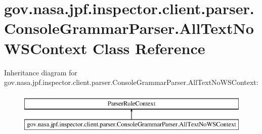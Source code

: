\hypertarget{classgov_1_1nasa_1_1jpf_1_1inspector_1_1client_1_1parser_1_1_console_grammar_parser_1_1_all_text_no_w_s_context}{}\section{gov.\+nasa.\+jpf.\+inspector.\+client.\+parser.\+Console\+Grammar\+Parser.\+All\+Text\+No\+W\+S\+Context Class Reference}
\label{classgov_1_1nasa_1_1jpf_1_1inspector_1_1client_1_1parser_1_1_console_grammar_parser_1_1_all_text_no_w_s_context}
Inheritance diagram for gov.\+nasa.\+jpf.\+inspector.\+client.\+parser.\+Console\+Grammar\+Parser.\+All\+Text\+No\+W\+S\+Context\+:\begin{figure}[H]
\begin{center}
\leavevmode
\includegraphics[height=2.000000cm]{classgov_1_1nasa_1_1jpf_1_1inspector_1_1client_1_1parser_1_1_console_grammar_parser_1_1_all_text_no_w_s_context}
\end{center}
\end{figure}
